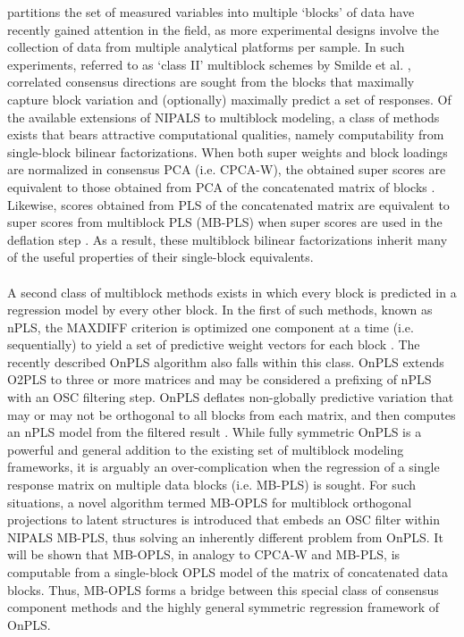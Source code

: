 \begin{doublespace}
partitions the set of measured variables into multiple `blocks' of data have
recently gained attention in the field, as more experimental designs involve
the collection of data from multiple analytical platforms per sample. In such
experiments, referred to as `class II' multiblock schemes by Smilde et al.
\cite{smilde:jchemo2003}, correlated consensus directions are sought from the
blocks that maximally capture block variation and (optionally) maximally
predict a set of responses. Of the available extensions of NIPALS to
multiblock modeling, a class of methods exists that bears attractive
computational qualities, namely computability from single-block bilinear
factorizations. When both super weights and block loadings are normalized in
consensus PCA (i.e. CPCA-W), the obtained super scores are equivalent to those
obtained from PCA of the concatenated matrix of blocks
\cite{westerhuis:jchemo1998}. Likewise, scores obtained from PLS of the
concatenated matrix are equivalent to super scores from multiblock PLS
(MB-PLS) when super scores are used in the deflation step
\cite{westerhuis:jchemo1997,westerhuis:jchemo1998}. As a result, these
multiblock bilinear factorizations inherit many of the useful properties
of their single-block equivalents.
\\\\
A second class of multiblock methods exists in which every block is predicted
in a regression model by every other block. In the first of such methods,
known as nPLS, the MAXDIFF criterion \cite{tenberge:psych1988} is optimized
one component at a time (i.e. sequentially) to yield a set of predictive
weight vectors for each block \cite{lofstedt:jchemo2011}. The recently
described OnPLS algorithm also falls within this class. OnPLS extends O2PLS
to three or more matrices and may be considered a prefixing of nPLS with an
OSC filtering step. OnPLS deflates non-globally predictive variation that
may or may not be orthogonal to all blocks from each matrix, and then computes
an nPLS model from the filtered result \cite{lofstedt:jchemo2011}. While fully
symmetric OnPLS is a powerful and general addition to the existing set of
multiblock modeling frameworks, it is arguably an over-complication when
the regression of a single response matrix on multiple data blocks
(i.e. MB-PLS) is sought. For such situations, a novel algorithm termed
MB-OPLS for multiblock orthogonal projections to latent structures is
introduced that embeds an OSC filter within NIPALS MB-PLS, thus solving an
inherently different problem from OnPLS. It will be shown that MB-OPLS, in
analogy to CPCA-W and MB-PLS, is computable from a single-block OPLS model
of the matrix of concatenated data blocks. Thus, MB-OPLS forms a bridge
between this special class of consensus component methods and the highly
general symmetric regression framework of OnPLS.
\end{doublespace}

